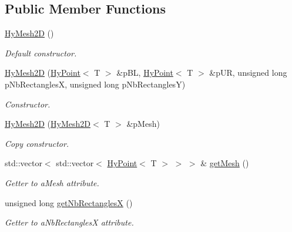 \subsection*{Public Member Functions}
\begin{DoxyCompactItemize}
\item 
\hypertarget{classHyMesh2D_ad6cb9da096558be08d3fa3c1f8929410}{
\hyperlink{classHyMesh2D_ad6cb9da096558be08d3fa3c1f8929410}{HyMesh2D} ()}
\label{classHyMesh2D_ad6cb9da096558be08d3fa3c1f8929410}

\begin{DoxyCompactList}\small\item\em Default constructor. \item\end{DoxyCompactList}\item 
\hyperlink{classHyMesh2D_a0b73e736d5f0a2fc253d4ef724968b1f}{HyMesh2D} (\hyperlink{classHyPoint}{HyPoint}$<$ T $>$ \&pBL, \hyperlink{classHyPoint}{HyPoint}$<$ T $>$ \&pUR, unsigned long pNbRectanglesX, unsigned long pNbRectanglesY)
\begin{DoxyCompactList}\small\item\em Constructor. \item\end{DoxyCompactList}\item 
\hyperlink{classHyMesh2D_addcbe5c16210083bf69b1210ea11d569}{HyMesh2D} (\hyperlink{classHyMesh2D}{HyMesh2D}$<$ T $>$ \&pMesh)
\begin{DoxyCompactList}\small\item\em Copy constructor. \item\end{DoxyCompactList}\item 
std::vector$<$ std::vector$<$ \hyperlink{classHyPoint}{HyPoint}$<$ T $>$ $>$ $>$ \& \hyperlink{classHyMesh2D_a8f075d7ba59bc759dc138109fd551496}{getMesh} ()
\begin{DoxyCompactList}\small\item\em Getter to aMesh attribute. \item\end{DoxyCompactList}\item 
unsigned long \hyperlink{classHyMesh2D_a8646d6b9e0b42270744a2b3c15af2563}{getNbRectanglesX} ()
\begin{DoxyCompactList}\small\item\em Getter to aNbRectanglesX attribute. \item\end{DoxyCompactList}\item 

\end{DoxyCompactItemize}
